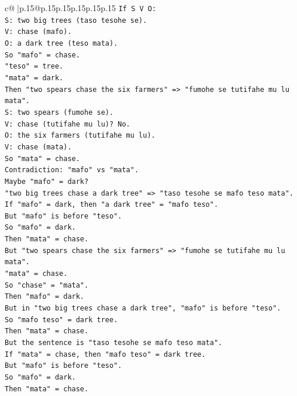 \documentclass{article}
\begin{document}
{\begin{supertabular}{c@{$\;$}|p{.15\linewidth}@{}p{.15\linewidth}p{.15\linewidth}p{.15\linewidth}p{.15\linewidth}p{.15\linewidth}}
{{{\texttt{If S V O:} \\
\texttt{S: two big trees (taso tesohe se).} \\
\texttt{V: chase (mafo).} \\
\texttt{O: a dark tree (teso mata).} \\
\texttt{So "mafo" = chase.} \\
\texttt{"teso" = tree.} \\
\texttt{"mata" = dark.} \\
\texttt{Then "two spears chase the six farmers" => "fumohe se tutifahe mu lu mata".} \\
\texttt{S: two spears (fumohe se).} \\
\texttt{V: chase (tutifahe mu lu)? No.} \\
\texttt{O: the six farmers (tutifahe mu lu).} \\
\texttt{V: chase (mata).} \\
\texttt{So "mata" = chase.} \\
\texttt{Contradiction: "mafo" vs "mata".} \\
\texttt{Maybe "mafo" = dark?} \\
\texttt{"two big trees chase a dark tree" => "taso tesohe se mafo teso mata".} \\
\texttt{If "mafo" = dark, then "a dark tree" = "mafo teso".} \\
\texttt{But "mafo" is before "teso".} \\
\texttt{So "mafo" = dark.} \\
\texttt{Then "mata" = chase.} \\
\texttt{But "two spears chase the six farmers" => "fumohe se tutifahe mu lu mata".} \\
\texttt{"mata" = chase.} \\
\texttt{So "chase" = "mata".} \\
\texttt{Then "mafo" = dark.} \\
\texttt{But in "two big trees chase a dark tree", "mafo" is before "teso".} \\
\texttt{So "mafo teso" = dark tree.} \\
\texttt{Then "mata" = chase.} \\
\texttt{But the sentence is "taso tesohe se mafo teso mata".} \\
\texttt{If "mata" = chase, then "mafo teso" = dark tree.} \\
\texttt{But "mafo" is before "teso".} \\
\texttt{So "mafo" = dark.} \\
\texttt{Then "mata" = chase.} \\
}}}
\end{supertabular}}
\end{document}
